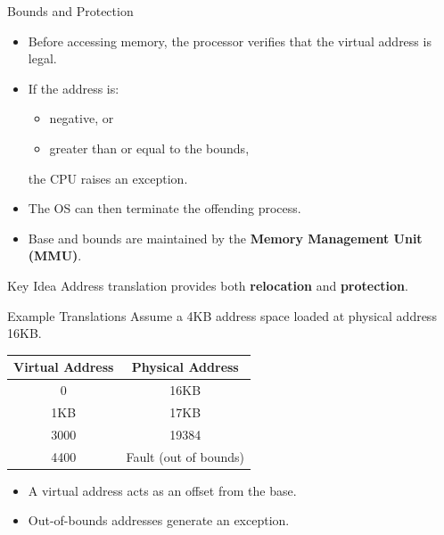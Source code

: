 \begin{frame}{Bounds and Protection}
    \begin{itemize}
        \item Before accessing memory, the processor verifies that
              the virtual address is legal.
        \item If the address is:
        \begin{itemize}
            \item negative, or
            \item greater than or equal to the bounds,
        \end{itemize}
        the CPU raises an exception.

        \item The OS can then terminate the offending process.
        \item Base and bounds are maintained by the
              \textbf{Memory Management Unit (MMU)}.
    \end{itemize}

    \begin{block}{Key Idea}
        Address translation provides both \textbf{relocation}
        and \textbf{protection}.
    \end{block}
\end{frame}


\begin{frame}{Example Translations}
    Assume a 4KB address space loaded at physical address 16KB.

    \begin{center}
        \begin{tabular}{c|c}
            \textbf{Virtual Address} & \textbf{Physical Address} \\
            \hline
            0     & 16KB \\
            1KB   & 17KB \\
            3000  & 19384 \\
            4400  & Fault (out of bounds)
        \end{tabular}
    \end{center}

    \begin{itemize}
        \item A virtual address acts as an offset from the base.
        \item Out-of-bounds addresses generate an exception.
    \end{itemize}
\end{frame}


